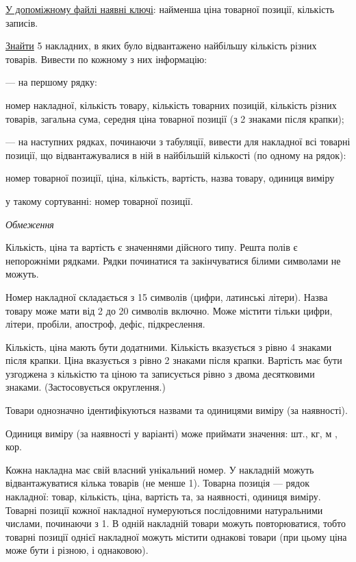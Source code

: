 \documentclass[11pt, ukrainian]{article}
\begin{document}
\underline{У допоміжному файлі наявні ключі}: найменша ціна товарної позиції, кількість записів.

\underline{Знайти} 5 накладних, в яких було відвантажено найбільшу кількість різних товарів. Вивести по кожному з них інформацію:\par
{\noindent}--- на першому рядку:\par
номер накладної, кількість товару, кількість товарних позицій, кількість різних товарів, загальна сума, середня ціна товарної позиції (з 2 знаками після крапки);

{\noindent}--- на наступних рядках, починаючи з табуляції, вивести для накладної всі товарні позиції, що відвантажувалися в ній в найбільшій кількості (по одному на рядок):\par
номер товарної позиції, ціна, кількість, вартість, назва товару, одиниця виміру

{\noindent}у такому сортуванні: номер товарної позиції.


\bigskip\textit{Обмеження}

Кількість, ціна та вартість є значеннями дійсного типу.
Решта полів є непорожніми рядками.
Рядки починатися та закінчуватися білими символами не можуть.

Номер накладної складається з 15 символів (цифри, латинські літери).
Назва товару може мати від 2 до 20 символів включно.
Може містити тільки цифри, літери, пробіли, апостроф, дефіс, підкреслення.

Кількість, ціна мають бути додатними.
Кількість вказується з рівно 4 знаками після крапки.
Ціна вказується з рівно 2 знаками після крапки.
Вартість має бути узгоджена з кількістю та ціною та записується рівно з двома десятковими знаками.
(Застосовується округлення.)

Товари однозначно ідентифікуються назвами та одиницями виміру (за наявності).

Одиниця виміру (за наявності у варіанті) може приймати значення: шт., кг, м , кор.

Кожна накладна має свій власний унікальний номер.
У накладній можуть відвантажуватися кілька товарів (не менше 1).
Товарна позиція --- рядок накладної: товар, кількість, ціна, вартість та, за наявності, одиниця виміру.
Товарні позиції кожної накладної нумеруються послідовними натуральними числами, починаючи з 1.
В одній накладній товари можуть повторюватися, 
тобто товарні позиції однієї накладної можуть містити однакові товари 
(при цьому ціна може бути і різною, і однаковою).
\end{document}
